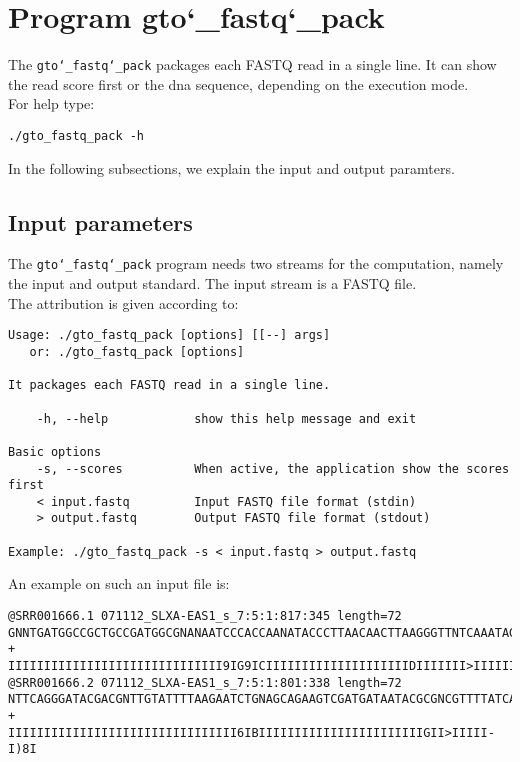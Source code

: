 \section{Program gto\char`_fastq\char`_pack}
The \texttt{gto\char`_fastq\char`_pack} packages each FASTQ read in a single line. It can show the read score first or the dna sequence, depending on the execution mode. \\
For help type:
\begin{lstlisting}
./gto_fastq_pack -h
\end{lstlisting}
In the following subsections, we explain the input and output paramters.

\subsection*{Input parameters}

The \texttt{gto\char`_fastq\char`_pack} program needs two streams for the computation,
namely the input and output standard. The input stream is a FASTQ file.\\
The attribution is given according to:
\begin{lstlisting}
Usage: ./gto_fastq_pack [options] [[--] args]
   or: ./gto_fastq_pack [options]

It packages each FASTQ read in a single line.

    -h, --help            show this help message and exit

Basic options
    -s, --scores          When active, the application show the scores first
    < input.fastq         Input FASTQ file format (stdin)
    > output.fastq        Output FASTQ file format (stdout)

Example: ./gto_fastq_pack -s < input.fastq > output.fastq

\end{lstlisting}
An example on such an input file is:
\begin{lstlisting}
@SRR001666.1 071112_SLXA-EAS1_s_7:5:1:817:345 length=72
GNNTGATGGCCGCTGCCGATGGCGNANAATCCCACCAANATACCCTTAACAACTTAAGGGTTNTCAAATAGA
+
IIIIIIIIIIIIIIIIIIIIIIIIIIIIII9IG9ICIIIIIIIIIIIIIIIIIIIIDIIIIIII>IIIIII/
@SRR001666.2 071112_SLXA-EAS1_s_7:5:1:801:338 length=72
NTTCAGGGATACGACGNTTGTATTTTAAGAATCTGNAGCAGAAGTCGATGATAATACGCGNCGTTTTATCAN
+
IIIIIIIIIIIIIIIIIIIIIIIIIIIIIIII6IBIIIIIIIIIIIIIIIIIIIIIIIGII>IIIII-I)8I
\end{lstlisting}

